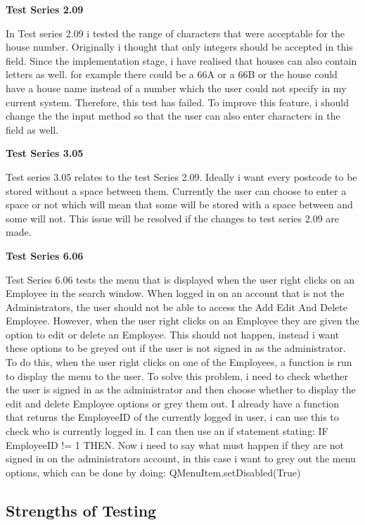 \textbf{Test Series 2.09}

In Test series 2.09 i tested the range of characters that were acceptable for the house number. Originally i thought that only integers should be accepted in this field. Since the implementation stage, i have realised that houses can also contain letters as well. for example there could be a 66A or a 66B or the house could have a house name instead of a number which the user could not specify in my current system. Therefore,  this test has failed. To improve this feature, i should change the the input method so that the user can also enter characters in the field as well.

\textbf{Test Series 3.05}

Test series 3.05 relates to the test Series 2.09. Ideally i want every postcode to be stored without a space between them. Currently the user can choose to enter a space or not which will mean that some will be stored with a space between and some will not. This issue will be resolved if the changes to test series 2.09 are made.

\textbf{Test Series 6.06}

Test Series 6.06 tests the menu that is displayed when the user right clicks on an Employee in the search window. When logged in on an account that is not the Administrators, the user should not be able to access the Add Edit And Delete Employee. However, when the user right clicks on an Employee they are given the option to edit or delete an Employee. This should not happen, instead i want these options to be greyed out if the user is not signed in as the administrator. To do this, when the user right clicks on one of the Employees, a function is run to display the menu to the user. To solve this problem, i need to check whether the user is signed in as the administrator and then choose whether to display the edit and delete Employee options or grey them out. I already have a function that returns the EmployeeID of the currently logged in user, i can use this to check who is currently logged in. I can then use an if statement stating: IF EmployeeID != 1 THEN. Now i need to say what must happen if they are not signed in on the administrators account, in this case i want to grey out the menu options, which can be done by doing: QMenuItem.setDisabled(True)



\subsection{Strengths of Testing}

